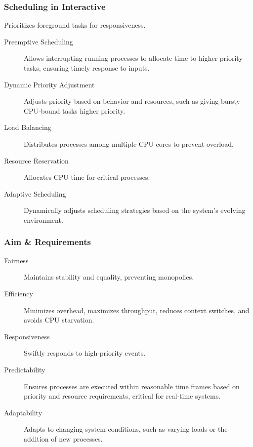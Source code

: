 \documentclass[11pt,journal,compsoc]{IEEEtran}
\begin{document}
\subsubsection{Scheduling in Interactive}

Prioritizes foreground tasks for responsiveness.

\begin{description}
    \item[Preemptive Scheduling] Allows interrupting running processes to allocate time to higher-priority tasks, ensuring timely response to inputs.
    
    \item[Dynamic Priority Adjustment] Adjusts priority based on behavior and resources, such as giving bursty CPU-bound tasks higher priority.
    
    \item[Load Balancing] Distributes processes among multiple CPU cores to prevent overload.
    
    \item[Resource Reservation] Allocates CPU time for critical processes.
    
    \item[Adaptive Scheduling] Dynamically adjusts scheduling strategies based on the system's evolving environment.
\end{description}


\subsubsection{Aim \& Requirements}

\begin{description}
    \item[Fairness] Maintains stability and equality, preventing monopolies.
    
    \item[Efficiency] Minimizes overhead, maximizes throughput, reduces context switches, and avoids CPU starvation.
    
    \item[Responsiveness] Swiftly responds to high-priority events.
    
    \item[Predictability] Ensures processes are executed within reasonable time frames based on priority and resource requirements, critical for real-time systems.
    
    \item[Adaptability] Adapts to changing system conditions, such as varying loads or the addition of new processes.
\end{description}
\end{document}
